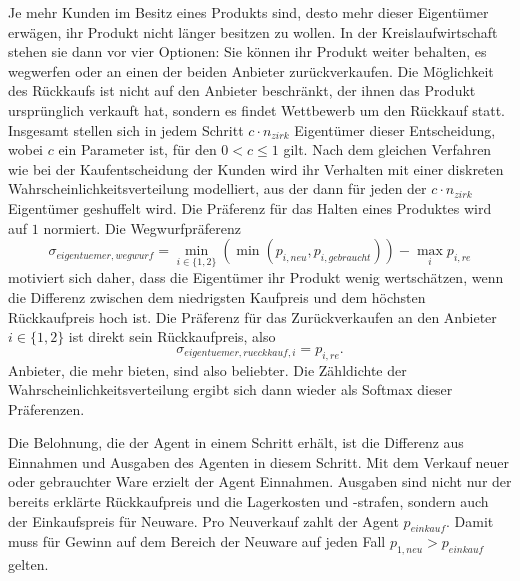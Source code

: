 Je mehr Kunden im Besitz eines Produkts sind, desto mehr dieser Eigentümer erwägen, ihr Produkt nicht länger besitzen zu wollen.
In der Kreislaufwirtschaft stehen sie dann vor vier Optionen:
Sie können ihr Produkt weiter behalten, es wegwerfen oder an einen der beiden Anbieter zurückverkaufen.
Die Möglichkeit des Rückkaufs ist nicht auf den Anbieter beschränkt, der ihnen das Produkt ursprünglich verkauft hat, sondern es findet Wettbewerb um den Rückkauf statt.
Insgesamt stellen sich in jedem Schritt $c \cdot n_{zirk}$ Eigentümer dieser Entscheidung, wobei $c$ ein Parameter ist, für den $0 < c \leq 1$ gilt.
Nach dem gleichen Verfahren wie bei der Kaufentscheidung der Kunden wird ihr Verhalten mit einer diskreten Wahrscheinlichkeitsverteilung modelliert, aus der dann für jeden der $c \cdot n_{zirk}$ Eigentümer geshuffelt wird.
Die Präferenz für das Halten eines Produktes wird auf $1$ normiert.
Die Wegwurfpräferenz
\begin{equation}
	\sigma_{eigentuemer, wegwurf} = \min_{i\in\{1, 2\}}{\left(\min{(p_{i, neu}, p_{i, gebraucht})}\right)} - \max_{i}{p_{i, re}}
\end{equation}
motiviert sich daher, dass die Eigentümer ihr Produkt wenig wertschätzen, wenn die Differenz zwischen dem niedrigsten Kaufpreis und dem höchsten Rückkaufpreis hoch ist.
Die Präferenz für das Zurückverkaufen an den Anbieter $i\in\{1, 2\}$ ist direkt sein Rückkaufpreis, also
\begin{equation}
	\sigma_{eigentuemer, rueckkauf, i} = p_{i, re}.
\end{equation}
Anbieter, die mehr bieten, sind also beliebter.
Die Zähldichte der Wahrscheinlichkeitsverteilung ergibt sich dann wieder als Softmax dieser Präferenzen.

Die Belohnung, die der Agent in einem Schritt erhält, ist die Differenz aus Einnahmen und Ausgaben des Agenten in diesem Schritt.
Mit dem Verkauf neuer oder gebrauchter Ware erzielt der Agent Einnahmen.
Ausgaben sind nicht nur der bereits erklärte Rückkaufpreis und die Lagerkosten und -strafen, sondern auch der Einkaufspreis für Neuware.
Pro Neuverkauf zahlt der Agent $p_{einkauf}$.
Damit muss für Gewinn auf dem Bereich der Neuware auf jeden Fall $p_{1, neu} > p_{einkauf}$ gelten.

